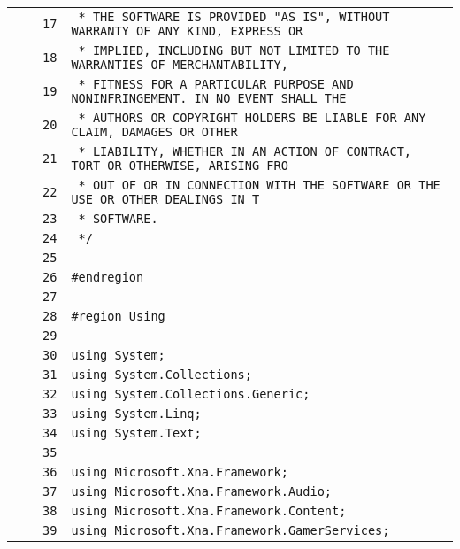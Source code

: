 \documentclass[a4paper,10pt]{article}
\begin{document}
\begin{longtable}[l]{lrrl}
\cellcolor{gray} &  & \verb~17~ & \verb~ * THE SOFTWARE IS PROVIDED "AS IS", WITHOUT WARRANTY OF ANY KIND, EXPRESS OR~\\
\cellcolor{gray} &  & \verb~18~ & \verb~ * IMPLIED, INCLUDING BUT NOT LIMITED TO THE WARRANTIES OF MERCHANTABILITY,~\\
\cellcolor{gray} &  & \verb~19~ & \verb~ * FITNESS FOR A PARTICULAR PURPOSE AND NONINFRINGEMENT. IN NO EVENT SHALL THE~\\
\cellcolor{gray} &  & \verb~20~ & \verb~ * AUTHORS OR COPYRIGHT HOLDERS BE LIABLE FOR ANY CLAIM, DAMAGES OR OTHER~\\
\cellcolor{gray} &  & \verb~21~ & \verb~ * LIABILITY, WHETHER IN AN ACTION OF CONTRACT, TORT OR OTHERWISE, ARISING FRO~\\
\cellcolor{gray} &  & \verb~22~ & \verb~ * OUT OF OR IN CONNECTION WITH THE SOFTWARE OR THE USE OR OTHER DEALINGS IN T~\\
\cellcolor{gray} &  & \verb~23~ & \verb~ * SOFTWARE.~\\
\cellcolor{gray} &  & \verb~24~ & \verb~ */~\\
\cellcolor{gray} &  & \verb~25~ & \verb~~\\
\cellcolor{gray} &  & \verb~26~ & \verb~#endregion~\\
\cellcolor{gray} &  & \verb~27~ & \verb~~\\
\cellcolor{gray} &  & \verb~28~ & \verb~#region Using~\\
\cellcolor{gray} &  & \verb~29~ & \verb~~\\
\cellcolor{gray} &  & \verb~30~ & \verb~using System;~\\
\cellcolor{gray} &  & \verb~31~ & \verb~using System.Collections;~\\
\cellcolor{gray} &  & \verb~32~ & \verb~using System.Collections.Generic;~\\
\cellcolor{gray} &  & \verb~33~ & \verb~using System.Linq;~\\
\cellcolor{gray} &  & \verb~34~ & \verb~using System.Text;~\\
\cellcolor{gray} &  & \verb~35~ & \verb~~\\
\cellcolor{gray} &  & \verb~36~ & \verb~using Microsoft.Xna.Framework;~\\
\cellcolor{gray} &  & \verb~37~ & \verb~using Microsoft.Xna.Framework.Audio;~\\
\cellcolor{gray} &  & \verb~38~ & \verb~using Microsoft.Xna.Framework.Content;~\\
\cellcolor{gray} &  & \verb~39~ & \verb~using Microsoft.Xna.Framework.GamerServices;~\\

\end{longtable}
\end{document}
